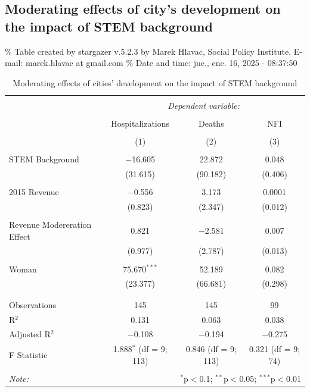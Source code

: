 \documentclass[
  letterpaper,
  DIV=11,
  numbers=noendperiod]{scrartcl}
\begin{document}
\subsection{Moderating effects of city's development on the impact of
STEM
background}\label{moderating-effects-of-citys-development-on-the-impact-of-stem-background}

\% Table created by stargazer v.5.2.3 by Marek Hlavac, Social Policy
Institute. E-mail: marek.hlavac at gmail.com \% Date and time: jue.,
ene. 16, 2025 - 08:37:50

\begin{table}[!htbp] \centering 
  \caption{Moderating effects of cities’ development on the impact of STEM background} 
  \label{} 
\begin{tabular}{@{\extracolsep{5pt}}lccc} 
\\[-1.8ex]\hline 
\hline \\[-1.8ex] 
 & \multicolumn{3}{c}{\textit{Dependent variable:}} \\ 
\cline{2-4} 
\\[-1.8ex] & Hospitalizations & Deaths & NFI \\ 
\\[-1.8ex] & (1) & (2) & (3)\\ 
\hline \\[-1.8ex] 
 STEM Background & $-$16.605 & 22.872 & 0.048 \\ 
  & (31.615) & (90.182) & (0.406) \\ 
  & & & \\ 
 2015 Revenue & $-$0.556 & 3.173 & 0.0001 \\ 
  & (0.823) & (2.347) & (0.012) \\ 
  & & & \\ 
 Revenue Modereration Effect & 0.821 & $-$2.581 & 0.007 \\ 
  & (0.977) & (2.787) & (0.013) \\ 
  & & & \\ 
 Woman & 75.670$^{***}$ & 52.189 & 0.082 \\ 
  & (23.377) & (66.681) & (0.298) \\ 
  & & & \\ 
\hline \\[-1.8ex] 
Observations & 145 & 145 & 99 \\ 
R$^{2}$ & 0.131 & 0.063 & 0.038 \\ 
Adjusted R$^{2}$ & $-$0.108 & $-$0.194 & $-$0.275 \\ 
F Statistic & 1.888$^{*}$ (df = 9; 113) & 0.846 (df = 9; 113) & 0.321 (df = 9; 74) \\ 
\hline 
\hline \\[-1.8ex] 
\textit{Note:}  & \multicolumn{3}{r}{$^{*}$p$<$0.1; $^{**}$p$<$0.05; $^{***}$p$<$0.01} \\ 
\end{tabular} 
\end{table}
\end{document}
